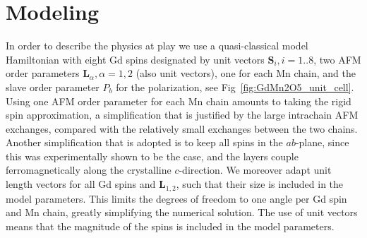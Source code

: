 \section{Modeling}
In order to describe the physics at play we use a quasi-classical model Hamiltonian with eight Gd spins designated by unit vectors $\mathbf{S}_i, i=1..8$, two AFM order parameters $\mathbf{L}_\alpha, \alpha=1,2$ (also unit vectors), one for each Mn chain, and the slave order parameter $P_b$ for the polarization, see Fig~\ref{fig:GdMn2O5_unit_cell}.
Using one AFM order parameter for each Mn chain amounts to taking the rigid spin approximation, a simplification that is justified by the large intrachain AFM exchanges, compared with the relatively small exchanges between the two chains.
Another simplification that is adopted is to keep all spins in the $ab$-plane, since this was experimentally shown to be the case, and the layers couple ferromagnetically along the crystalline $c$-direction\cite{Lee13}. We moreover adapt unit length vectors for all Gd spins and $\mathbf{L}_{1,2}$, such that their size is included in the model parameters. This limits the degrees of freedom to one angle per Gd spin and Mn chain, greatly simplifying the numerical solution.
The use of unit vectors means that the magnitude of the spins is included in the model parameters.

